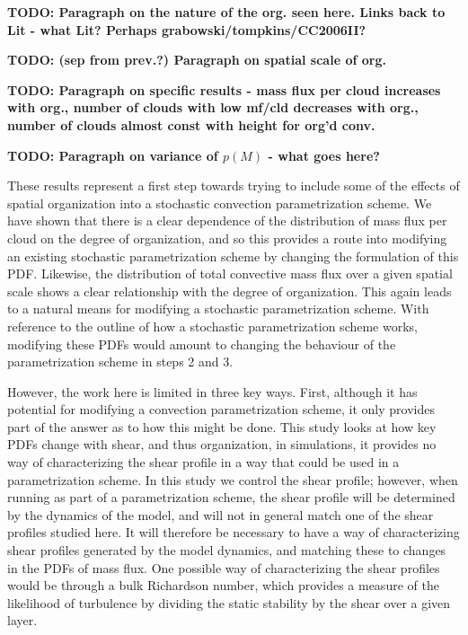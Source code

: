 \documentclass[11pt,a4paper]{article}
\newcommand\todo[1]{\textbf{TODO: #1}}
\begin{document}
\todo{Paragraph on the nature of the org. seen here. Links back to Lit - what Lit? Perhaps grabowski/tompkins/CC2006II?}

\todo{(sep from prev.?) Paragraph on spatial scale of org.}

\todo{Paragraph on specific results - mass flux per cloud increases with org., number of clouds with low mf/cld decreases with org., number of clouds almost const with height for org'd conv.}

\todo{Paragraph on variance of $p(M)$ - what goes here?}

These results represent a first step towards trying to include some of the effects of spatial organization into a stochastic convection parametrization scheme. We have shown that there is a clear dependence of the distribution of mass flux per cloud on the degree of organization, and so this provides a route into modifying an existing stochastic parametrization scheme by changing the formulation of this PDF. Likewise, the distribution of total convective mass flux over a given spatial scale shows a clear relationship with the degree of organization. This again leads to a natural means for modifying a stochastic parametrization scheme. With reference to the outline of how a stochastic parametrization scheme works, modifying these PDFs would amount to changing the behaviour of the parametrization scheme in steps 2 and 3.

However, the work here is limited in three key ways. First, although it has potential for modifying a convection parametrization scheme, it only provides part of the answer as to how this might be done. This study looks at how key PDFs change with shear, and thus organization, in simulations, it provides no way of characterizing the shear profile in a way that could be used in a parametrization scheme. In this study we control the shear profile; however, when running as part of a parametrization scheme, the shear profile will be determined by the dynamics of the model, and will not in general match one of the shear profiles studied here. It will therefore be necessary to have a way of characterizing shear profiles generated by the model dynamics, and matching these to changes in the PDFs of mass flux. One possible way of characterizing the shear profiles would be through a bulk Richardson number, which provides a measure of the likelihood of turbulence by dividing the static stability by the shear over a given layer.
\end{document}
